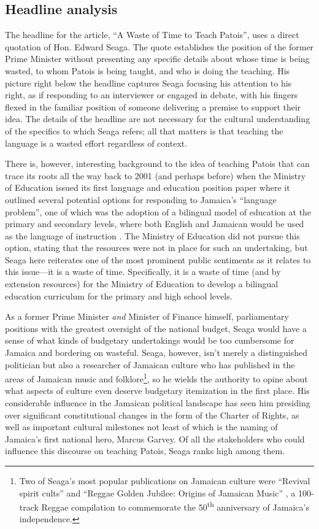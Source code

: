 \documentclass[output=paper,colorlinks,citecolor=brown]{langscibook}
\begin{document}
\subsection{Headline analysis}

The headline for the article, “A Waste of Time to Teach Patois”, uses a direct quotation of Hon. Edward Seaga. The quote establishes the position of the former Prime Minister without presenting any specific details about whose time is being wasted, to whom Patois is being taught, and who is doing the teaching. His picture right below the headline captures Seaga focusing his attention to his right, as if responding to an interviewer or engaged in debate, with his fingers flexed in the familiar position of someone delivering a premise to support their idea. The details of the headline are not necessary for the cultural understanding of the specifics to which Seaga refers; all that matters is that teaching the language is a wasted effort regardless of context.
 
There is, however, interesting background to the idea of teaching Patois that can trace its roots all the way back to 2001 (and perhaps before) when the Ministry of Education issued its first language and education position paper where it outlined several potential options for responding to Jamaica’s “language problem”, one of which was the adoption of a bilingual model of education at the primary and secondary levels, where both English and Jamaican would be used as the language of instruction \citep{MOEYC2001}. The Ministry of Education did not pursue this option, stating that the resources were not in place for such an undertaking, but Seaga here reiterates one of the most prominent public sentiments as it relates to this issue—it is a waste of time. Specifically, it is a waste of time (and by extension resources) for the Ministry of Education to develop a bilingual education curriculum for the primary and high school levels. 

As a former Prime Minister \emph{and} Minister of Finance himself, parliamentary positions with the greatest oversight of the national budget, Seaga would have a sense of what kinds of budgetary undertakings would be too cumbersome for Jamaica and bordering on wasteful. Seaga, however, isn’t merely a distinguished politician but also a researcher of Jamaican culture who has published in the areas of Jamaican music and folklore\footnote{Two of Seaga’s most popular publications on Jamaican culture were “Revival spirit cults” \citep{SeagaEdward1968} and “Reggae Golden Jubilee: Origins of Jamaican Music” \citep{SeagaEdward-album-2012}, a 100-track Reggae compilation to commemorate the 50\textsuperscript{th} anniversary of Jamaica’s independence.}, so he wields the authority to opine about what aspects of culture even deserve budgetary itemization in the first place. His considerable influence in the Jamaican political landscape has seen him presiding over significant constitutional changes in the form of the Charter of Rights, as well as important cultural milestones not least of which is the naming of Jamaica’s first national hero, Marcus Garvey. Of all the stakeholders who could influence this discourse on teaching Patois, Seaga ranks high among them.
\end{document}
